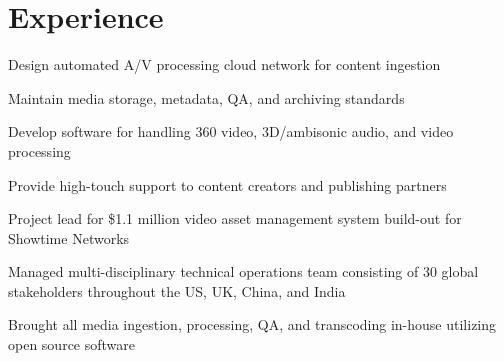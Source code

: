 \documentclass[letterpaper]{deedy-resume} %
\begin{document}
\begin{minipage}[t]{0.66\textwidth} %


\section{Experience}


\vspace{\topsep} %
\begin{tightitemize}
\item Design automated A/V processing cloud network for content ingestion
\item Maintain media storage, metadata, QA, and archiving standards
\item Develop software for handling 360 video, 3D/ambisonic audio, and video processing
\item Provide high-touch support to content creators and publishing partners
\end{tightitemize}

\sectionspace %



\begin{tightitemize}
\item Project lead for \$1.1 million video asset management system build-out for Showtime Networks
\item Managed multi-disciplinary technical operations team consisting of 30 global stakeholders throughout the US, UK, China, and India
\item Brought all media ingestion, processing, QA, and transcoding in-house utilizing open source software
\end{tightitemize}

\sectionspace %




\end{minipage}
\end{document}
